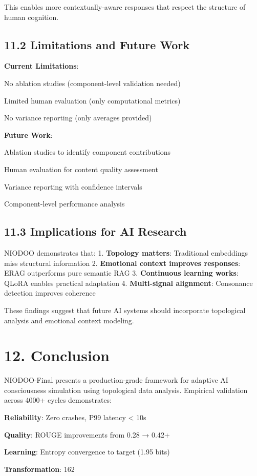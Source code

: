 \documentclass[11pt,a4paper]{article}
\begin{document}
This enables more contextually-aware responses that respect the structure of human cognition.

\subsection{11.2 Limitations and Future Work}

\textbf{Current Limitations}:
\item No ablation studies (component-level validation needed)
\item Limited human evaluation (only computational metrics)
\item No variance reporting (only averages provided)

\textbf{Future Work}:
\item Ablation studies to identify component contributions
\item Human evaluation for content quality assessment
\item Variance reporting with confidence intervals
\item Component-level performance analysis

\subsection{11.3 Implications for AI Research}

NIODOO demonstrates that:
1. \textbf{Topology matters}: Traditional embeddings miss structural information
2. \textbf{Emotional context improves responses}: ERAG outperforms pure semantic RAG
3. \textbf{Continuous learning works}: QLoRA enables practical adaptation
4. \textbf{Multi-signal alignment}: Consonance detection improves coherence

These findings suggest that future AI systems should incorporate topological analysis and emotional context modeling.

\section{12. Conclusion}

NIODOO-Final presents a production-grade framework for adaptive AI consciousness simulation using topological data analysis. Empirical validation across 4000+ cycles demonstrates:
\item \textbf{Reliability}: Zero crashes, P99 latency < 10s
\item \textbf{Quality}: ROUGE improvements from 0.28 → 0.42+
\item \textbf{Learning}: Entropy convergence to target (1.95 bits)
\item \textbf{Transformation}: 162%
\end{document}
